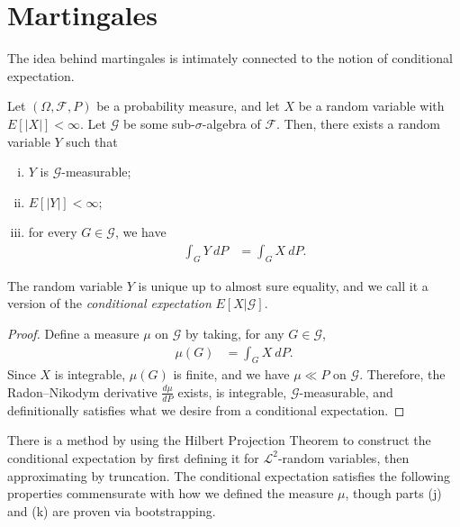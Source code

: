 \documentclass[10pt]{mypackage}
\begin{document}
\section{Martingales}%
The idea behind martingales is intimately connected to the notion of conditional expectation.
\begin{theorem}
  Let $\left( \Omega,\mathcal{F},P \right)$ be a probability measure, and let $X$ be a random variable with $E\left[ \left\vert X \right\vert \right] < \infty$. Let $\mathcal{G}$ be some sub-$\sigma$-algebra of $\mathcal{F}$. Then, there exists a random variable $Y$ such that
  \begin{enumerate}[(i)]
    \item $Y$ is $\mathcal{G}$-measurable;
    \item $E\left[ \left\vert Y \right\vert \right] < \infty$;
    \item for every $G\in \mathcal{G}$, we have
      \begin{align*}
        \int_{G}^{} Y\:dP &= \int_{G}^{} X\:dP.
      \end{align*}
  \end{enumerate}
  The random variable $Y$ is unique up to almost sure equality, and we call it a version of the \textit{conditional expectation} $E\left[ X|\mathcal{G} \right]$.
\end{theorem}
\begin{proof}
  Define a measure $\mu$ on $\mathcal{G}$ by taking, for any $G\in \mathcal{G}$,
  \begin{align*}
    \mu\left( G \right) &= \int_{G}^{} X\:dP.
  \end{align*}
  Since $X$ is integrable, $\mu\left( G \right)$ is finite, and we have $\mu\ll P$ on $\mathcal{G}$. Therefore, the Radon--Nikodym derivative $\frac{d\mu}{dP}$ exists, is integrable, $\mathcal{G}$-measurable, and definitionally satisfies what we desire from a conditional expectation.
\end{proof}
There is a method by using the Hilbert Projection Theorem to construct the conditional expectation by first defining it for $\mathcal{L}^2$-random variables, then approximating by truncation. The conditional expectation satisfies the following properties commensurate with how we defined the measure $\mu$, though parts (j) and (k) are proven via bootstrapping.
\end{document}
